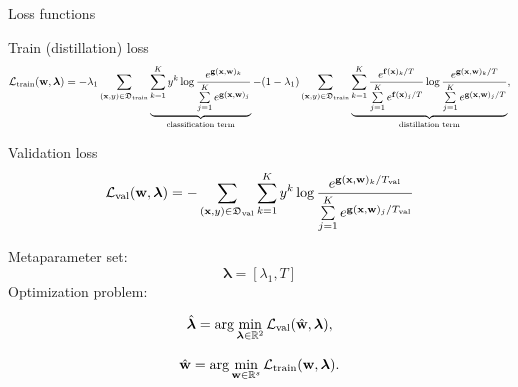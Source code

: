 \documentclass[12pt, aspectratio=169]{beamer}
\begin{document}
\begin{frame}{Loss functions}
\fontsize{10}{5}\selectfont
\begin{block}{Train (distillation) loss}
\vspace{-0.7 cm}
\fontsize{10}{5}\selectfont
\begin{multline*}
    \mathcal{L}_\text{train}(\mathbf{w}, \boldsymbol{\lambda}) = -\lambda_1\sum\limits_{(\mathbf{x}, y) \in \mathfrak{D}_\text{train}}\underbrace{\sum\limits_{k=1}^{K}y^k\log \frac{e^{\mathbf{g}(\mathbf{x}, \mathbf{w})_k}}{\sum\limits_{j=1}^{K}e^{\mathbf{g}(\mathbf{x}, \mathbf{w})_j}}}_{\text{classification term}} - (1 - \lambda_1)\sum\limits_{(\mathbf{x}, y) \in \mathfrak{D}_\text{train}}\underbrace{\sum\limits_{k=1}^{K}\frac{e^{\mathbf{f}(\mathbf{x})_k/T}}{\sum\limits_{j=1}^{K}e^{\mathbf{f}(\mathbf{x})_j/T}}\log \frac{e^{\mathbf{g}(\mathbf{x}, \mathbf{w})_k/T}}{\sum\limits_{j=1}^{K}e^{\mathbf{g}(\mathbf{x}, \mathbf{w})_j/T}}}_{\text{distillation term}},
\end{multline*}
\end{block}
\vspace{-0.5 cm}
\fontsize{10}{5}\selectfont
\begin{block}{Validation loss}
\vspace{-0.5 cm}
\fontsize{10}{5}\selectfont
\begin{equation*} \label{eq:l_val}
     \mathcal{L}_\text{val}(\mathbf{w}, \boldsymbol{\lambda}) = - \sum\limits_{(\mathbf{x}, y) \in \mathfrak{D}_\text{val}}\sum\limits_{k=1}^{K}y^k\log \frac{e^{\mathbf{g}(\mathbf{x}, \mathbf{w})_k/T_\text{val}}}{\sum\limits_{j=1}^Ke^{\mathbf{g}(\mathbf{x}, \mathbf{w})_j/T_\text{val}}}
\end{equation*}
\end{block}
\vspace{-0.2 cm}
\fontsize{10}{5}\selectfont
Metaparameter set:
\vspace{-0.2 cm}
\fontsize{10}{5}\selectfont
$$\boldsymbol{\lambda} = [\lambda_1, T]$$
\fontsize{10}{5}\selectfont
Optimization problem:
\vspace{-0.2 cm}
\fontsize{10}{5}\selectfont

\begin{equation}
    \hat{\boldsymbol{\lambda}} = \arg\min\limits_{\boldsymbol{\lambda} \in \mathbb{R}^2} \mathcal{L}_\text{val}(\hat{\mathbf{w}}, \boldsymbol{\lambda}),
    \label{eq:opt_hyp}
\end{equation}

\begin{equation*}
    \hat{\mathbf{w}} = \arg\min\limits_{\mathbf{w} \in \mathbb{R}^s} \mathcal{L}_\text{train}(\mathbf{w}, \boldsymbol{\lambda}).
\end{equation*}
\end{frame}
\end{document}
